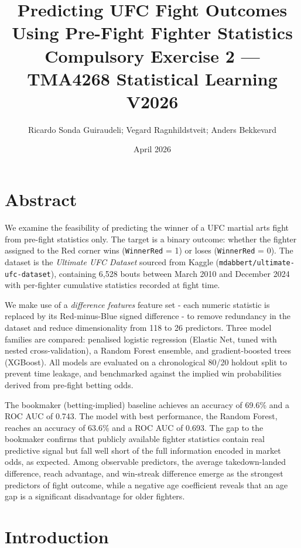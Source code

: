 \documentclass{article}
\title{Predicting UFC Fight Outcomes Using Pre-Fight Fighter Statistics\\
\large Compulsory Exercise 2 --- TMA4268 Statistical Learning V2026}
\author{Ricardo Sonda Guiraudeli; Vegard Ragnhildstveit; Anders Bekkevard}
\date{April 2026}
\begin{document}
\maketitle

\section*{Abstract}

We examine the feasibility of predicting the winner of a UFC martial arts
fight from pre-fight statistics only.
The target is a binary outcome: whether the fighter assigned to the Red
corner wins (\texttt{WinnerRed} = 1) or loses (\texttt{WinnerRed} = 0).
The dataset is the \emph{Ultimate UFC Dataset} sourced from Kaggle
(\texttt{mdabbert/ultimate-ufc-dataset}), containing 6{,}528 bouts between
March 2010 and December 2024 with per-fighter cumulative statistics recorded
at fight time.

We make use of a \emph{difference features} feature set - each numeric statistic is
replaced by its Red-minus-Blue signed difference - to remove redundancy 
in the dataset and reduce dimensionality from 118 to 26 predictors.
Three model families are compared: penalised logistic regression (Elastic
Net, tuned with nested cross-validation), a Random Forest ensemble, and
gradient-boosted trees (XGBoost).
All models are evaluated on a chronological 80/20 holdout split to prevent
time leakage, and benchmarked against the implied win probabilities
derived from pre-fight betting odds.

The bookmaker (betting-implied) baseline achieves an accuracy of 69.6\% and a ROC AUC of 0.743.
The model with best performance, the Random Forest, reaches an accuracy of 63.6\%
and a ROC AUC of 0.693.
The gap to the bookmaker confirms that publicly available fighter statistics
contain real predictive signal but fall well short of the full information
encoded in market odds, as expected.
Among observable predictors, the average takedown-landed difference, reach
advantage, and win-streak difference emerge as the strongest predictors of
fight outcome, while a negative age coefficient reveals that an age gap is a 
significant disadvantage for older fighters.

\section{Introduction}
\end{document}
